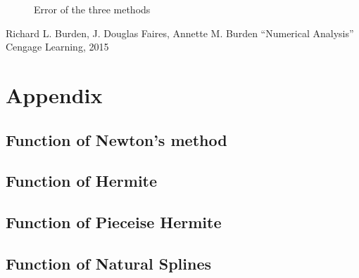 \documentclass{article}
\begin{document}
\begin{figure}[htbp]
\centering
{}
\quad
\quad
{}
\caption{Error of the three methods}
\end{figure}

\newpage
\clearpage
{}
{}
\begin{thebibliography}{99}  
Richard L. Burden, J. Douglas Faires, Annette M. Burden “Numerical Analysis” Cengage Learning, 2015
\end{thebibliography}

\newpage
\section*{Appendix}
\subsection*{Function of Newton's method}

\subsection*{Function of Hermite}

\subsection*{Function of Pieceise Hermite}

\subsection*{Function of Natural Splines}

\end{document}

